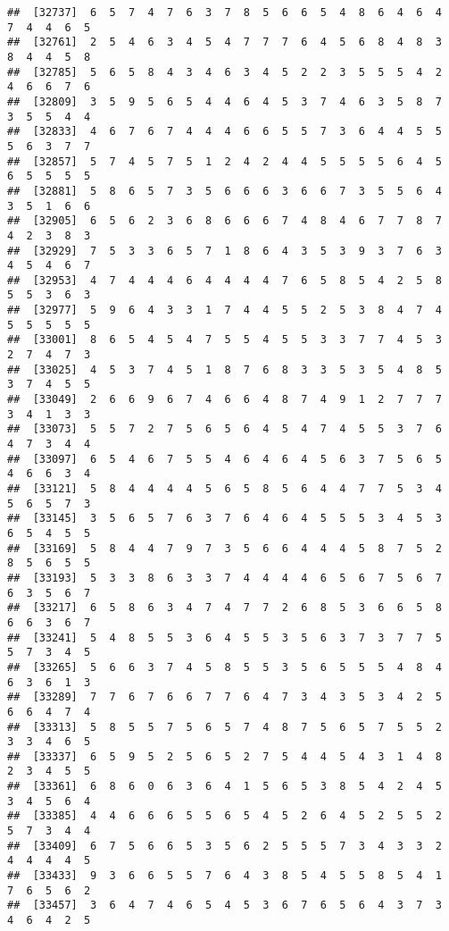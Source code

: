 \documentclass[
]{book}
\begin{document}
\begin{verbatim}
##  [32737]  6  5  7  4  7  6  3  7  8  5  6  6  5  4  8  6  4  6  4  7  4  4  6  5
##  [32761]  2  5  4  6  3  4  5  4  7  7  7  6  4  5  6  8  4  8  3  8  4  4  5  8
##  [32785]  5  6  5  8  4  3  4  6  3  4  5  2  2  3  5  5  5  4  2  4  6  6  7  6
##  [32809]  3  5  9  5  6  5  4  4  6  4  5  3  7  4  6  3  5  8  7  3  5  5  4  4
##  [32833]  4  6  7  6  7  4  4  4  6  6  5  5  7  3  6  4  4  5  5  5  6  3  7  7
##  [32857]  5  7  4  5  7  5  1  2  4  2  4  4  5  5  5  5  6  4  5  6  5  5  5  5
##  [32881]  5  8  6  5  7  3  5  6  6  6  3  6  6  7  3  5  5  6  4  3  5  1  6  6
##  [32905]  6  5  6  2  3  6  8  6  6  6  7  4  8  4  6  7  7  8  7  4  2  3  8  3
##  [32929]  7  5  3  3  6  5  7  1  8  6  4  3  5  3  9  3  7  6  3  4  5  4  6  7
##  [32953]  4  7  4  4  4  6  4  4  4  4  7  6  5  8  5  4  2  5  8  5  5  3  6  3
##  [32977]  5  9  6  4  3  3  1  7  4  4  5  5  2  5  3  8  4  7  4  5  5  5  5  5
##  [33001]  8  6  5  4  5  4  7  5  5  4  5  5  3  3  7  7  4  5  3  2  7  4  7  3
##  [33025]  4  5  3  7  4  5  1  8  7  6  8  3  3  5  3  5  4  8  5  3  7  4  5  5
##  [33049]  2  6  6  9  6  7  4  6  6  4  8  7  4  9  1  2  7  7  7  3  4  1  3  3
##  [33073]  5  5  7  2  7  5  6  5  6  4  5  4  7  4  5  5  3  7  6  4  7  3  4  4
##  [33097]  6  5  4  6  7  5  5  4  6  4  6  4  5  6  3  7  5  6  5  4  6  6  3  4
##  [33121]  5  8  4  4  4  4  5  6  5  8  5  6  4  4  7  7  5  3  4  5  6  5  7  3
##  [33145]  3  5  6  5  7  6  3  7  6  4  6  4  5  5  5  3  4  5  3  6  5  4  5  5
##  [33169]  5  8  4  4  7  9  7  3  5  6  6  4  4  4  5  8  7  5  2  8  5  6  5  5
##  [33193]  5  3  3  8  6  3  3  7  4  4  4  4  6  5  6  7  5  6  7  6  3  5  6  7
##  [33217]  6  5  8  6  3  4  7  4  7  7  2  6  8  5  3  6  6  5  8  6  6  3  6  7
##  [33241]  5  4  8  5  5  3  6  4  5  5  3  5  6  3  7  3  7  7  5  5  7  3  4  5
##  [33265]  5  6  6  3  7  4  5  8  5  5  3  5  6  5  5  5  4  8  4  6  3  6  1  3
##  [33289]  7  7  6  7  6  6  7  7  6  4  7  3  4  3  5  3  4  2  5  6  6  4  7  4
##  [33313]  5  8  5  5  7  5  6  5  7  4  8  7  5  6  5  7  5  5  2  3  3  4  6  5
##  [33337]  6  5  9  5  2  5  6  5  2  7  5  4  4  5  4  3  1  4  8  2  3  4  5  5
##  [33361]  6  8  6  0  6  3  6  4  1  5  6  5  3  8  5  4  2  4  5  3  4  5  6  4
##  [33385]  4  4  6  6  6  5  5  6  5  4  5  2  6  4  5  2  5  5  2  5  7  3  4  4
##  [33409]  6  7  5  6  6  5  3  5  6  2  5  5  5  7  3  4  3  3  2  4  4  4  4  5
##  [33433]  9  3  6  6  5  5  7  6  4  3  8  5  4  5  5  8  5  4  1  7  6  5  6  2
##  [33457]  3  6  4  7  4  6  5  4  5  3  6  7  6  5  6  4  3  7  3  4  6  4  2  5

\end{verbatim}
\end{document}
